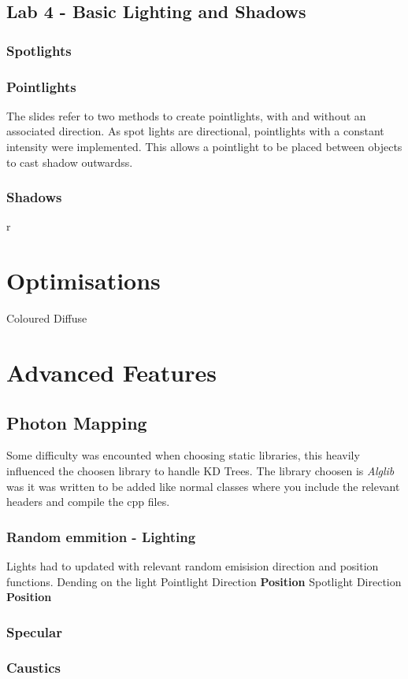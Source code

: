 \documentclass{article}
\begin{document}
\subsection{Lab 4 - Basic Lighting and Shadows}
\subsubsection{Spotlights}

\subsubsection{Pointlights}
The slides refer to two methods to create pointlights, with and without an associated direction. As spot lights are directional, pointlights with a constant intensity were implemented. This allows a pointlight to be placed between objects to cast shadow outwardss.
\subsubsection{Shadows}
r
\section{Optimisations}
Coloured Diffuse


\section{Advanced Features}
\subsection{Photon Mapping}
Some difficulty was encounted when choosing static libraries, this heavily influenced the choosen library to handle KD Trees. The library choosen is \textit{Alglib} was it was written to be added like normal classes where you include the relevant headers and compile the cpp files. 
\subsubsection{Random emmition - Lighting}
Lights had to updated with relevant random emisision direction and position functions. Dending on the light 
Pointlight
Direction
\textbf{Position}
Spotlight
Direction
\textbf{Position}
\subsubsection{Specular}
\subsubsection{Caustics}
\end{document}
